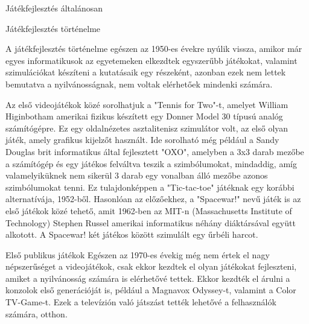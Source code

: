 \begin{MyChapter}{Játékfejlesztés általánosan}

	\begin{MySection}{Játékfejlesztés történelme}
		
		A játékfejlesztés történelme egészen az 1950-es évekre nyúlik vissza, amikor már egyes informatikusok az egyetemeken elkezdtek egyszerűbb játékokat, valamint szimulációkat készíteni a kutatásaik egy részeként, azonban ezek nem lettek bemutatva a nyilvánosságnak, nem voltak elérhetőek mindenki számára.  \cite{video_game_development}
		
		Az első videojátékok közé sorolhatjuk a "Tennis for Two"-t, amelyet William Higinbotham amerikai fizikus készített egy Donner Model 30 típusú analóg számítógépre. Ez egy oldalnézetes asztalitenisz szimulátor volt, az első olyan játék, amely grafikus kijelzőt használt.
		Ide sorolható még például a Sandy Douglas brit informatikus által fejlesztett "OXO", amelyben a 3x3 darab mezőbe a számítógép és egy játékos felváltva teszik a szimbólumokat, mindaddig, amíg valamelyiküknek nem sikerül 3 darab egy vonalban álló mezőbe azonos szimbólumokat tenni. Ez tulajdonképpen a "Tic-tac-toe" játéknak egy korábbi alternatívája, 1952-ből.
		Hasonlóan az előzőekhez, a "Spacewar!" nevű játék is az első játékok közé tehető, amit 1962-ben az MIT-n (Massachusetts Institute of Technology) Stephen Russel amerikai informatikus néhány diáktársával együtt alkotott. A Spacewar! két játékos között szimulált egy űrbéli harcot. 
		
		
		\begin{MySubSection}{Első publikus játékok}
		Egészen az 1970-es évekig még nem értek el nagy népszerűséget a videojátékok, csak ekkor kezdtek el olyan játékokat fejleszteni, amiket a nyilvánosság számára is elérhetővé tettek. Ekkor kezdték el árulni a konzolok első generációját is, például a Magnavox Odyssey-t, valamint a Color TV-Game-t. Ezek a televízión való játszást tették lehetővé a felhasználók számára, otthon.
		

\end{MySubSection}
\end{MySection}
\end{MyChapter}
